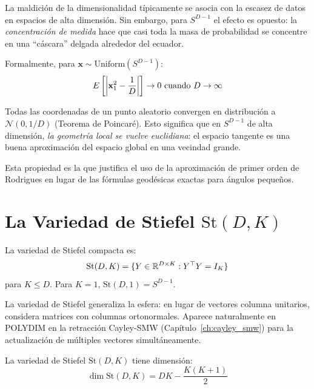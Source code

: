 La maldición de la dimensionalidad típicamente se asocia con la escasez de datos
en espacios de alta dimensión. Sin embargo, para $S^{D-1}$ el efecto es opuesto:
la \textit{concentración de medida} hace que casi toda la masa de probabilidad
se concentre en una ``cáscara'' delgada alrededor del ecuador.

Formalmente, para $\mathbf{x} \sim \text{Uniform}(S^{D-1})$:
\begin{equation}
E\left[\abs{\mathbf{x}_1^2 - \frac{1}{D}}\right] \to 0 \text{ cuando } D \to \infty
\end{equation}

Todas las coordenadas de un punto aleatorio convergen en distribución a
$\mathcal{N}(0, 1/D)$ (Teorema de Poincaré). Esto significa que en $S^{D-1}$
de alta dimensión, \textit{la geometría local se vuelve euclidiana}: el espacio
tangente es una buena aproximación del espacio global en una vecindad grande.

Esta propiedad es la que justifica el uso de la aproximación de primer orden de
Rodrigues en lugar de las fórmulas geodésicas exactas para ángulos pequeños.

\section{La Variedad de Stiefel $\text{St}(D, K)$}

\begin{definition}
La variedad de Stiefel compacta es:
\begin{equation}
\text{St}(D, K) = \{Y \in \mathbb{R}^{D \times K} : Y^\top Y = I_K\}
\end{equation}
para $K \le D$. Para $K = 1$, $\text{St}(D, 1) = S^{D-1}$.
\end{definition}

La variedad de Stiefel generaliza la esfera: en lugar de vectores columna unitarios,
considera matrices con columnas ortonormales. Aparece naturalmente en POLYDIM
en la retracción Cayley-SMW (Capítulo~\ref{ch:cayley_smw}) para la actualización
de múltiples vectores simultáneamente.

\begin{theorem}
\label{thm:stiefel_dim}
La variedad de Stiefel $\text{St}(D,K)$ tiene dimensión:
\begin{equation}
\dim \text{St}(D,K) = DK - \frac{K(K+1)}{2}
\end{equation}
\end{theorem}

